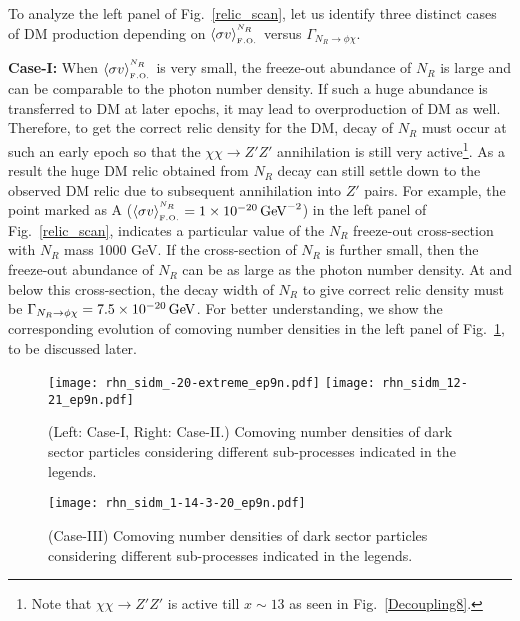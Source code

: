 \documentclass[prd,nofootinbib,preprint,superscriptaddress]{revtex4}
\begin{document}
To analyze the left panel of Fig.~\ref{relic_scan}, let us identify three distinct cases of DM production depending on  $\langle\sigma v \rangle^{^{N_R}}_{_{ \rm F.O.}}$ versus $\Gamma_{N_R \to \phi \chi}$. 

{\bf Case-I:} When $\langle\sigma v \rangle^{^{N_R}}_{_{ \rm F.O.}}$ is very small, the freeze-out abundance of $N_R$ is large and can be comparable to the photon number density. If such a huge abundance is transferred to DM at later epochs, it may lead to overproduction of DM as well. Therefore, to get the correct relic density for the DM, decay of $N_R$ must occur at such an early epoch so that the $\chi \chi \to Z'Z'$ annihilation is still very active\footnote{Note that $\chi \chi \to Z'Z'$ is active till $x \sim 13$ as seen in Fig.~\ref{Decoupling8}.}. As a result the huge DM relic obtained from $N_R$ decay can still settle down to the observed DM relic due to subsequent annihilation into $Z'$ pairs. For example, the point marked as A ($\langle\sigma v \rangle^{^{N_R}}_{_{ \rm F.O.}}= 1\times10^{-20}\, {\rm GeV}^{-2}$) in the left panel of Fig.~\ref{relic_scan}, indicates a particular value of the $N_R$ freeze-out cross-section with $N_R$ mass 1000 GeV. If the cross-section of $N_R$ is 
further small, then the freeze-out abundance of $N_R$ can be as large as the photon number density. At and below this cross-section, the decay width of $N_R$ to give correct relic density must be $\Gamma_{N_R \to \phi \chi}= 7.5\times 10^{-20}\,{\rm GeV}$. For better understanding, we show the corresponding evolution of comoving number densities in the left panel of Fig.~\ref{relic1}, to be discussed later. 


\begin{figure}[h!]
	\centering
	\texttt{[image: rhn\_sidm\_-20-extreme\_ep9n.pdf]}
	\texttt{[image: rhn\_sidm\_12-21\_ep9n.pdf]}
	\caption{ (Left: Case-I, Right: Case-II.) Comoving number densities of dark sector particles considering different sub-processes indicated in the legends.}
	\label{relic1}
\end{figure} 
\begin{figure}[h!]
	\centering
	\texttt{[image: rhn\_sidm\_1-14-3-20\_ep9n.pdf]}
	\caption{(Case-III) Comoving number densities of dark sector particles considering different sub-processes indicated in the legends.}
	\label{relic2}
\end{figure} 
\end{document}
